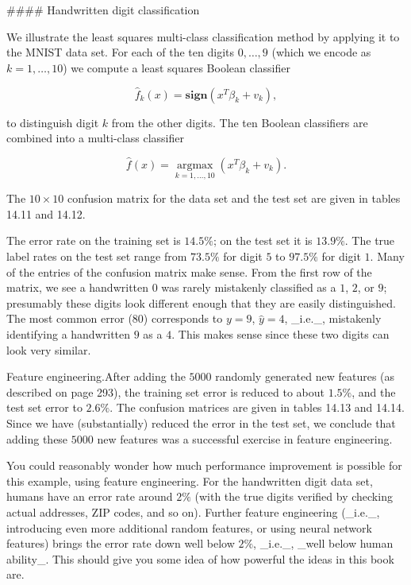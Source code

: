 

#### Handwritten digit classification

We illustrate the least squares multi-class classification method by applying it to the MNIST data set. For each of the ten digits \(0,\ldots,9\) (which we encode as \(k=1,\ldots,10\)) we compute a least squares Boolean classifier

\[\hat{f}_{k}(x)=\mathbf{sign}(x^{T}\beta_{k}+v_{k}),\]

to distinguish digit \(k\) from the other digits. The ten Boolean classifiers are combined into a multi-class classifier

\[\hat{f}(x)=\operatorname*{argmax}_{k=1,\ldots,10}(x^{T}\beta_{k}+v_{k}).\]

The \(10\times 10\) confusion matrix for the data set and the test set are given in tables 14.11 and 14.12.

The error rate on the training set is \(14.5\%\); on the test set it is \(13.9\%\). The true label rates on the test set range from \(73.5\%\) for digit \(5\) to \(97.5\%\) for digit \(1\). Many of the entries of the confusion matrix make sense. From the first row of the matrix, we see a handwritten \(0\) was rarely mistakenly classified as a \(1\), \(2\), or \(9\); presumably these digits look different enough that they are easily distinguished. The most common error (80) corresponds to \(y=9\), \(\hat{y}=4\), _i.e._, mistakenly identifying a handwritten \(9\) as a \(4\). This makes sense since these two digits can look very similar.

Feature engineering.After adding the \(5000\) randomly generated new features (as described on page 293), the training set error is reduced to about \(1.5\%\), and the test set error to \(2.6\%\). The confusion matrices are given in tables 14.13 and 14.14. Since we have (substantially) reduced the error in the test set, we conclude that adding these \(5000\) new features was a successful exercise in feature engineering.

You could reasonably wonder how much performance improvement is possible for this example, using feature engineering. For the handwritten digit data set, humans have an error rate around \(2\%\) (with the true digits verified by checking actual addresses, ZIP codes, and so on). Further feature engineering (_i.e._, introducing even more additional random features, or using neural network features) brings the error rate down well below \(2\%\), _i.e._, _well below human ability_. This should give you some idea of how powerful the ideas in this book are.


